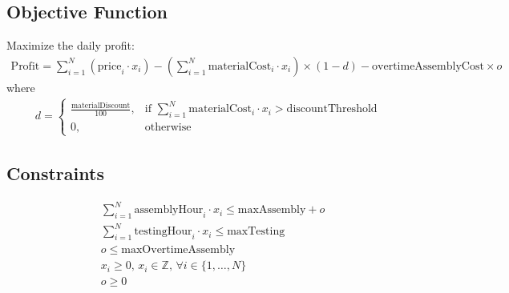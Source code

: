 \documentclass{article}
\begin{document}
\subsection*{Objective Function}
Maximize the daily profit:
\begin{align*}
    \text{Profit} = \sum_{i=1}^{N} \left(\text{price}_i \cdot x_i \right) - \left( \sum_{i=1}^{N} \text{materialCost}_i \cdot x_i  \right) \times \left(1 - d\right) - \text{overtimeAssemblyCost} \times o 
\end{align*}
where
\begin{align*}
    d = 
    \begin{cases} 
      \frac{\text{materialDiscount}}{100}, & \text{if } \sum_{i=1}^{N} \text{materialCost}_i \cdot x_i > \text{discountThreshold} \\
      0, & \text{otherwise}
    \end{cases}
\end{align*}

\subsection*{Constraints}
\begin{align*}
    & \sum_{i=1}^{N} \text{assemblyHour}_i \cdot x_i \leq \text{maxAssembly} + o \\
    & \sum_{i=1}^{N} \text{testingHour}_i \cdot x_i \leq \text{maxTesting} \\
    & o \leq \text{maxOvertimeAssembly} \\
    & x_i \geq 0, \, x_i \in \mathbb{Z}, \, \forall i \in \{1, \ldots, N\} \\
    & o \geq 0
\end{align*}
\end{document}
